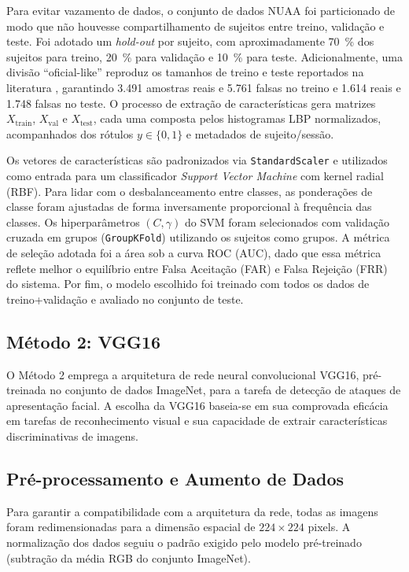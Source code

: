 \documentclass[
	article,			%
	11pt,				%
	oneside,			%
	a4paper,			%
	english,			%
	brazil,				%
	sumario=tradicional
	]{abntex2}
\begin{document}
Para evitar vazamento de dados, o conjunto de dados NUAA foi particionado de modo que não houvesse compartilhamento de sujeitos entre treino, validação e teste. Foi adotado um \emph{hold-out} por sujeito, com aproximadamente 70 \% dos sujeitos para treino, 20 \% para validação e 10 \% para teste. Adicionalmente, uma divisão “oficial-like” reproduz os tamanhos de treino e teste reportados na literatura \cite{Tan2010_LivenessDetection}, garantindo 3.491 amostras reais e 5.761 falsas no treino e 1.614 reais e 1.748 falsas no teste. O processo de extração de características gera matrizes $X_{\mathrm{train}}$, $X_{\mathrm{val}}$ e $X_{\mathrm{test}}$, cada uma composta pelos histogramas LBP normalizados, acompanhados dos rótulos $y\in\{0,1\}$ e metadados de sujeito/sessão.

Os vetores de características são padronizados via \texttt{StandardScaler} e utilizados como entrada para um classificador \textit{Support Vector Machine} com kernel radial (RBF). Para lidar com o desbalanceamento entre classes, as ponderações de classe foram ajustadas de forma inversamente proporcional à frequência das classes. Os hiperparâmetros $(C,\gamma)$ do SVM foram selecionados com validação cruzada em grupos (\texttt{GroupKFold}) utilizando os sujeitos como grupos. A métrica de seleção adotada foi a área sob a curva ROC (AUC), dado que essa métrica reflete melhor o equilíbrio entre Falsa Aceitação (FAR) e Falsa Rejeição (FRR) do sistema. Por fim, o modelo escolhido foi treinado com todos os dados de treino+validação e avaliado no conjunto de teste.


\subsection{Método 2: VGG16}
O Método 2 emprega a arquitetura de rede neural convolucional VGG16, pré-treinada no conjunto de dados ImageNet, para a tarefa de detecção de ataques de apresentação facial. A escolha da VGG16 baseia-se em sua comprovada eficácia em tarefas de reconhecimento visual e sua capacidade de extrair características discriminativas de imagens.

\subsection{Pré-processamento e Aumento de Dados}
Para garantir a compatibilidade com a arquitetura da rede, todas as imagens foram redimensionadas para a dimensão espacial de $224 \times 224$ pixels. A normalização dos dados seguiu o padrão exigido pelo modelo pré-treinado (subtração da média RGB do conjunto ImageNet).
\end{document}
